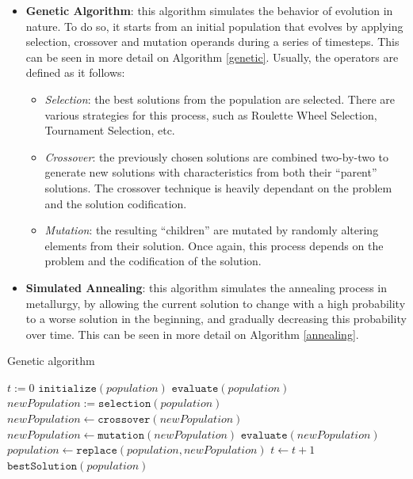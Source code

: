 \documentclass{article}[12pt]
\begin{document}
	\begin{itemize}
		\item \textbf{Genetic Algorithm}: this algorithm simulates the behavior of evolution in nature. To do so, it starts from an initial population that evolves by applying selection, crossover and mutation operands during a series of timesteps. This can be seen in more detail on Algorithm \ref{genetic}. Usually, the operators are defined as it follows:
		\begin{itemize}
			\item \textit{Selection}: the best solutions from the population are selected. There are various strategies for this process, such as Roulette Wheel Selection, Tournament Selection, etc.
			\item \textit{Crossover}: the previously chosen solutions are combined two-by-two to generate new solutions with characteristics from both their ``parent'' solutions. The crossover technique is heavily dependant on the problem and the solution codification.
			\item \textit{Mutation}: the resulting ``children'' are mutated by randomly altering elements from their solution. Once again, this process depends on the problem and the codification of the solution.
		\end{itemize}
		
		\item \textbf{Simulated Annealing}: this algorithm simulates the annealing process in metallurgy, by allowing the current solution to change with a high probability to a worse solution in the beginning, and gradually decreasing this probability over time. This can be seen in more detail on Algorithm \ref{annealing}.
	\end{itemize}
	
	\begin{algorithm}
	\caption{Genetic algorithm}\label{genetic}
	\begin{algorithmic}[1]
			\State $t := 0$
			\State $\texttt{initialize}(population)$
			\State $\texttt{evaluate}(population)$
				\State $newPopulation := \texttt{selection}(population)$
				\State $newPopulation \gets \texttt{crossover}(newPopulation)$
				\State $newPopulation \gets \texttt{mutation}(newPopulation)$
				\State $\texttt{evaluate}(newPopulation)$
				\State $population \gets \texttt{replace}(population, newPopulation)$
				\State $t \gets t + 1$
			\EndWhile
			\Return $\texttt{bestSolution}(population)$
		\EndProcedure
	\end{algorithmic}
	\end{algorithm}
	
\end{document}
